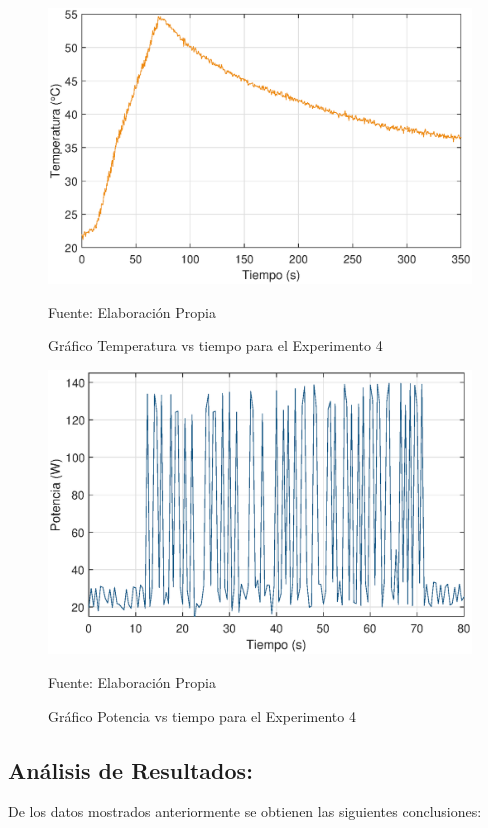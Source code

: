\begin{figure}[H]
\centering
\includegraphics[scale=0.65]{Figuras/Exp3_T.eps}
\caption{Gráfico Temperatura vs tiempo para el Experimento 4}
Fuente: Elaboración Propia
\label{exp3_T}
\end{figure}

\begin{figure}[H]
\centering
\includegraphics[scale=0.65]{Figuras/Exp3_P.eps}
\caption{Gráfico Potencia vs tiempo para el Experimento 4}
Fuente: Elaboración Propia
\label{exp3_P}
\end{figure}

\subsection{Análisis de Resultados:}

De los datos mostrados anteriormente se obtienen las siguientes conclusiones:

